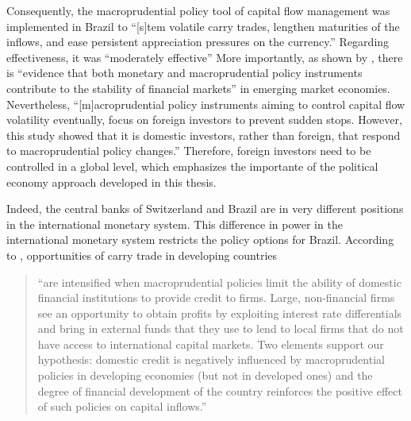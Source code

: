 \documentclass[a4paper, twoside]{templates/ociamthesis}
\begin{document}
Consequently, the macroprudential policy tool of capital flow management was implemented in Brazil to ``{[}s{]}tem volatile carry trades, lengthen maturities of the inflows, and ease persistent appreciation pressures on the currency.'' \autocite[ 43]{moura2017} Regarding effectiveness, it was ``moderately effective'' \autocite[ 43]{moura2017} More importantly, as shown by \textcite[ 600]{uzakdogan2020}, there is ``evidence that both monetary and macroprudential policy instruments contribute to the stability of financial markets'' in emerging market economies. Nevertheless, ``{[}m{]}acroprudential policy instruments aiming to control capital flow volatility eventually, focus on foreign investors to prevent sudden stops. However, this study showed that it is domestic investors, rather than foreign, that respond to macroprudential policy changes.'' Therefore, foreign investors need to be controlled in a global level, which emphasizes the importante of the political economy approach developed in this thesis.

Indeed, the central banks of Switzerland and Brazil are in very different positions in the international monetary system. This difference in power in the international monetary system restricts the policy options for Brazil. According to \textcite[ 104]{aguirre2019}, opportunities of carry trade in developing countries

\begin{quote}
``are intensified when macroprudential policies limit the ability of domestic financial institutions to provide credit to firms. Large, non-financial firms see an opportunity to obtain profits by exploiting interest rate differentials and bring in external funds that they use to lend to local firms that do not have access to international capital markets. Two elements support our hypothesis: domestic credit is negatively influenced by macroprudential policies in developing economies (but not in developed ones) and the degree of financial development of the country reinforces the positive effect of such policies on capital inflows.''
\end{quote}
\end{document}

